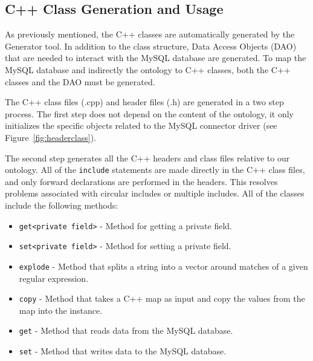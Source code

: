 \subsection{C++ Class Generation and Usage}
As previously mentioned, the C++ classes are automatically generated by the Generator tool. In addition to the class structure, 
Data Access Objects (DAO) that are needed to interact with the MySQL database are generated. 
To map the MySQL database and indirectly the ontology to C++ classes, both the C++ classes and
the DAO must be generated.

The C++ class files (.cpp) and header files (.h) are generated in a two step process.
The first step does not depend on the content of the ontology, it only initializes the specific objects related to the MySQL connector driver
(see Figure~\ref{fig:headerclass}).

The second step generates all the C++ headers and class files relative to our ontology. 
All of the \texttt{include} statements  are made directly in the C++ class files, and only forward declarations are performed in the headers. 
This resolves problems associated with circular includes or multiple includes. All of the classes include the following methods:
\begin{itemize}
\item \texttt{get<private field>} - Method for getting a private field.
\item \texttt{set<private field>} - Method for setting a private field.
\item \texttt{explode} - Method that splits a string into a vector around matches of a given regular expression. 
\item \texttt{copy} -  Method that takes a C++ map as input and copy the values from the map into the instance.
\item \texttt{get} - Method that reads data from the MySQL database.
\item \texttt{set} - Method that writes data to the MySQL database.
\end{itemize}

